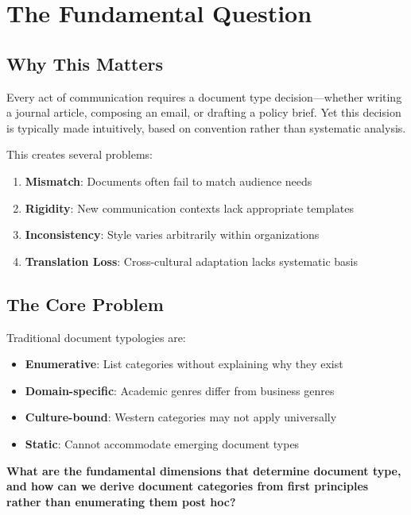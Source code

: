 \section{The Fundamental Question}
\label{sec:doctype-theory-fundamental}

\subsection{Why This Matters}

Every act of communication requires a document type decision---whether writing
a journal article, composing an email, or drafting a policy brief. Yet this
decision is typically made intuitively, based on convention rather than
systematic analysis.

This creates several problems:

\begin{enumerate}
\item \textbf{Mismatch}: Documents often fail to match audience needs
\item \textbf{Rigidity}: New communication contexts lack appropriate templates
\item \textbf{Inconsistency}: Style varies arbitrarily within organizations
\item \textbf{Translation Loss}: Cross-cultural adaptation lacks systematic basis
\end{enumerate}

\subsection{The Core Problem}

Traditional document typologies are:
\begin{itemize}[nosep]
\item \textbf{Enumerative}: List categories without explaining why they exist
\item \textbf{Domain-specific}: Academic genres differ from business genres
\item \textbf{Culture-bound}: Western categories may not apply universally
\item \textbf{Static}: Cannot accommodate emerging document types
\end{itemize}

\begin{tcolorbox}[colback=red!5!white, colframe=red!75!black,
    title=The Fundamental Question]
\textbf{What are the fundamental dimensions that determine document type,
and how can we derive document categories from first principles rather
than enumerating them post hoc?}
\end{tcolorbox}


